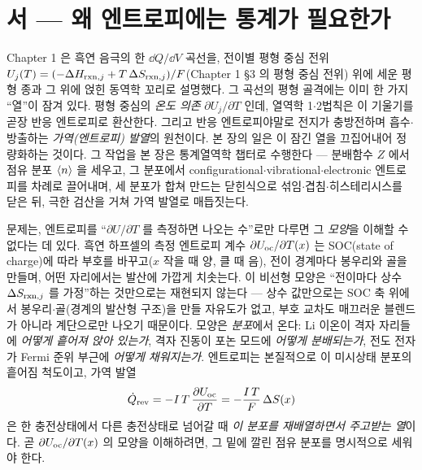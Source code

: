 \section*{서 --- 왜 엔트로피에는 통계가 필요한가}

Chapter 1 은 흑연 음극의 한 $\dd Q/\dd V$ 곡선을, 전이별 평형 중심 전위
$U_j(T)=(-\Delta H_{\mathrm{rxn},j}+T\,\Delta S_{\mathrm{rxn},j})/F$(Chapter 1 §3 의 평형 중심 전위) 위에 세운 평형 종과 그 위에
얹힌 동역학 꼬리로 설명했다. 그 곡선의 평형 골격에는 이미 한 가지 ``열''이 잠겨 있다. 평형 중심의
\emph{온도 의존} $\partial U_j/\partial T$ 인데, 열역학 1$\cdot$2법칙은 이 기울기를 곧장 반응 엔트로피로 환산한다.
그리고 반응 엔트로피야말로 전지가 충방전하며 흡수$\cdot$방출하는 \emph{가역(엔트로피) 발열}의 원천이다.
본 장의 일은 이 잠긴 열을 끄집어내어 정량화하는 것이다. 그 작업을 본 장은 통계열역학 챕터로 수행한다 ---
분배함수 $Z$ 에서 점유 분포 $\langle n\rangle$ 을 세우고, 그 분포에서 configurational$\cdot$vibrational$\cdot$electronic
엔트로피를 차례로 끌어내며, 세 분포가 합쳐 만드는 닫힌식으로 섞임$\cdot$겹침$\cdot$히스테리시스를 닫은 뒤,
극한 검산을 거쳐 가역 발열로 매듭짓는다.

문제는, 엔트로피를 ``$\partial U/\partial T$ 를 측정하면 나오는 수''로만 다루면 그 \emph{모양}을 이해할 수
없다는 데 있다. 흑연 하프셀의 측정 엔트로피 계수 $\partial U_{\mathrm{oc}}/\partial T(x)$ 는 SOC(state of charge)에 따라
부호를 바꾸고($x$ 작을 때 양, 클 때 음), 전이 경계마다 봉우리와 골을 만들며, 어떤 자리에서는 발산에 가깝게
치솟는다. 이 비선형 모양은 ``전이마다 상수 $\Delta S_{\mathrm{rxn},j}$ 를 가정''하는 것만으로는 재현되지
않는다 --- 상수 값만으로는 SOC 축 위에서 봉우리$\cdot$골(경계의 발산형 구조)을 만들 자유도가 없고,
부호 교차도 매끄러운 블렌드가 아니라 계단으로만 나오기 때문이다.
모양은 \emph{분포}에서 온다: Li 이온이 격자 자리들에 \emph{어떻게 흩어져 앉아 있는가}, 격자 진동이 포논
모드에 \emph{어떻게 분배되는가}, 전도 전자가 Fermi 준위 부근에 \emph{어떻게 채워지는가}. 엔트로피는 본질적으로
이 미시상태 분포의 흩어짐 척도이고, 가역 발열
\[
\dot Q_{\mathrm{rev}}=-I\,T\,\frac{\partial U_{\mathrm{oc}}}{\partial T}=-\frac{I\,T}{F}\,\Delta S(x)
\]
은 한 충전상태에서 다른 충전상태로 넘어갈 때 \emph{이 분포를 재배열하면서 주고받는 열}이다. 곧
$\partial U_{\mathrm{oc}}/\partial T(x)$ 의 모양을 이해하려면, 그 밑에 깔린 점유 분포를 명시적으로 세워야 한다.

